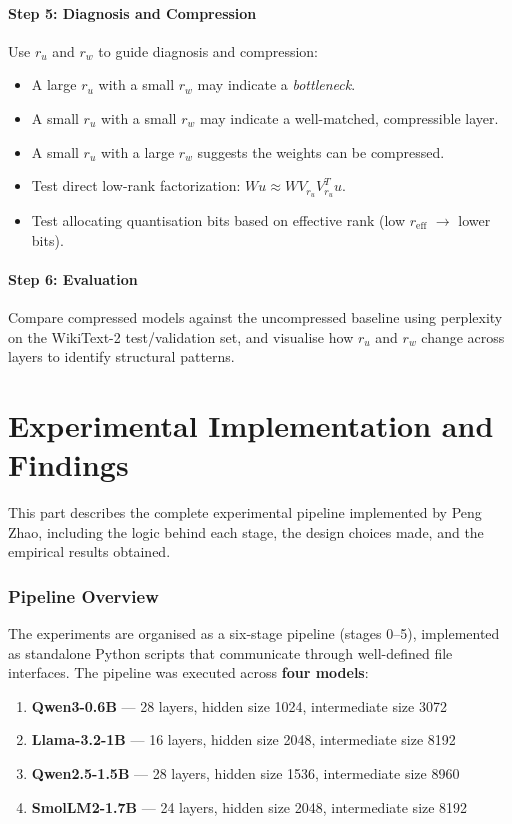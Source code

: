 \documentclass[11pt]{article}
\begin{document}
\subsection{Step 5: Diagnosis and Compression}
Use $r_u$ and $r_w$ to guide diagnosis and compression:
\begin{itemize}
    \item A large $r_u$ with a small $r_w$ may indicate a \emph{bottleneck}.
    \item A small $r_u$ with a small $r_w$ may indicate a well-matched, compressible layer.
    \item A small $r_u$ with a large $r_w$ suggests the weights can be compressed.
    \item Test direct low-rank factorization: $Wu \approx W V_{r_u} V_{r_u}^T u$.
    \item Test allocating quantisation bits based on effective rank (low $r_{\mathrm{eff}}$ $\rightarrow$ lower bits).
\end{itemize}

\subsection{Step 6: Evaluation}
Compare compressed models against the uncompressed baseline using perplexity on the WikiText-2 test/validation set, and visualise how $r_u$ and $r_w$ change across layers to identify structural patterns.


\part{Experimental Implementation and Findings}

This part describes the complete experimental pipeline implemented by Peng Zhao, including the logic behind each stage, the design choices made, and the empirical results obtained.

\section{Pipeline Overview}

The experiments are organised as a six-stage pipeline (stages 0--5), implemented as standalone Python scripts that communicate through well-defined file interfaces.  The pipeline was executed across \textbf{four models}:
\begin{enumerate}
    \item \textbf{Qwen3-0.6B} --- 28 layers, hidden size 1024, intermediate size 3072
    \item \textbf{Llama-3.2-1B} --- 16 layers, hidden size 2048, intermediate size 8192
    \item \textbf{Qwen2.5-1.5B} --- 28 layers, hidden size 1536, intermediate size 8960
    \item \textbf{SmolLM2-1.7B} --- 24 layers, hidden size 2048, intermediate size 8192
\end{enumerate}
\end{document}
